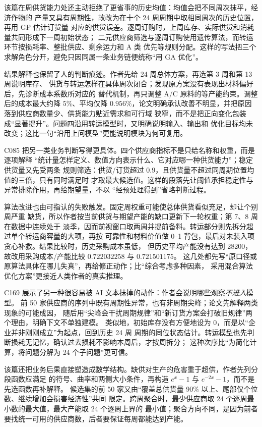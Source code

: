 \documentclass[UTF8,a4paper,12pt]{ctexart}
\begin{document}
该篇在周供货能力处还主动拒绝了更省事的历史均值：均值会把不同周次抹平，经济作物的
产量又具有周期性，故改为在十个 24 周周期中取相同周次的历史位置，再用 GP 估计订货量
对应的供货误差。逐周订购时，上周库存、实际供货和消耗量共同形成下一周初始状态；
二元供应商筛选与逐周订购使用遗传算法，而转运环节按损耗率、整批供应、剩余运力和 A 类
优先等规则分配。这样的写法把三个求解角色分开，避免只因同属一条业务链便统称“用 GA
优化”。

结果解释也保留了人的判断痕迹。作者先给 24 周总体方案，再选第 3 周和第 13 周说明库存、
供货与转运怎样在具体周次闭合；发现原方案没有表现出材料偏好后，先诊断成本系数所对应的
替代机制，再只调整 A/C 原料的等产能约束。调整后的成本最大约降 $5\%$、平均仅降
$0.956\%$，论文明确承认改善不明显，并把原因落到供应商数量少、供货能力贴近需求和可行域
狭窄，而不是把正向变化包装成“显著提升”。问题四沿用转运模型时，又明确说明输入、输出和
优化目标均未改变；这比一句“沿用上问模型”更能说明模块为何可复用。

C085 把另一类业务判断写得更具体。四个供应商指标不是只给名称和权重，而是逐项解释
“统计量怎样定义、数值方向表示什么、它对应哪一种供货能力”；稳定供货量又先受两条
规则筛选：供货/订货超过 $0.9$，且供货量不超过同周期位置均值的三倍，只有同时满足时
才取最大候选值。这样的段落先让阈值承担稳定性与异常排除作用，再给期望量，不以
“经预处理得到”省略判断过程。

算法改进也由可指认的失败触发。固定周权重可能使总体供货看似充足，却让个别周严重
缺货，所以作者按当前供货与期望产能的缺口更新下一轮权重；第 7、8 周在数据中连续处于
淡季，因而前视窗口取两周并提前备料。转运部分则先拆分超过单个转运商容量的大项，再按
可靠性和材料价值做 0--1 背包，最后对未装入项贪心补救。结果比较时，历史采购成本虽低，
但历史平均产能没有达到 28200，故改用采购成本/产能比较 $0.722032258$ 与 $0.721501175$。
这几处都先写“原口径或原算法具体在哪儿失真”，再给修正动作；比“综合考虑多种因素，
采用混合算法优化方案”更接近人类作者的真实推理。

C169 展示了另一种很容易被 AI 文本抹掉的动作：作者会说明哪些观察\emph{不进入}模型。
前 50 家供应商的序列中既有周期性异常，也有非周期尖峰；论文先解释两类现象的可能成因，
随后用“尖峰会干扰周期规律”和“新订货方案会打破旧规律”两个理由，明确下文不单独建模。
类似地，初始库存没有方便地设为 0，而是以“企业并非刚刚成立”为起点，回到历史 24 周
周期的同位状态估计。转运模型也先判断损耗无记忆，确认过去损耗不影响本周后，才按周拆分；
这种次序比“为简化计算，将问题分解为 24 个子问题”更可信。

该篇还把业务后果直接塑造成数学结构。缺供对生产的危害重于超供，作者先列分段函数应满足
的符号、曲率和两侧大小条件，再构造 $e^x-1$ 与 $e^{-2x}-1$，而不是先选函数再补解释。
候选集的前 50 家又由“覆盖总供货量 90\% 以上、尾部仅个位数、继续增加会损害经济性”共同
限定。跨周聚合时，最少供应商取 24 个逐周最小数的最大值，最大产能取 24 个逐周上界的
最小值；聚合方向不同，是因为前者要找统一可用的供应商数，后者要保证每周都能达到产能。
\end{document}

